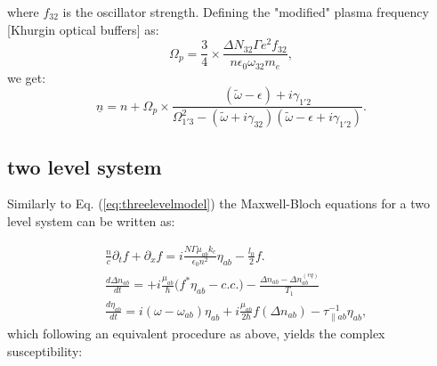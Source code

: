 \documentclass[10pt,letterpaper]{article}
\def\uline{\underline}
\begin{document}
	where $f_{32}$ is the oscillator strength. Defining the "modified" plasma frequency [Khurgin optical buffers] as: 
	$$
	\Omega_p = \frac{3}{4}\times \frac{\Delta N_{32}\Gamma e^2f_{32}}{n\epsilon_0\omega_{32}m_e}, 
	$$
	we get:
	$$
	\uline{n} = n+ \Omega_p \times \frac{(\tilde{\omega}-\epsilon)+i\gamma_{1'2}}{\Omega_{1'3}^2-(\tilde{\omega}+i\gamma_{32})(\tilde{\omega}-\epsilon+i\gamma_{1'2})}.
	$$ 
	
	\subsection{two level system}
	
	Similarly to Eq. (\ref{eq:threelevelmodel}) the Maxwell-Bloch equations for a two level system can be written as: 
	
	\begin{subequations}
		\label{eq:twolevelmodel}
		\begin{align}
		&\frac{n}{c}\partial_t f + \partial_{x}f = i\frac{N \Gamma \mu_{ab} k_c}{\epsilon_0 n^2} \eta_{ab} - \frac{l_0}{2} f \label{eq:rtwave} .\\
		&\frac{d \Delta n_{ab}}{d t} = + i\frac{\mu_{ab}}{\hbar} \big (f^*\eta_{ab}- c.c. \big )- \frac{\Delta n_{ab}-\Delta n_{ab}^{(eq)} }{T_{1}}  \\
		&\frac{d \eta_{ab}}{d t}   = i(\omega - \omega_{ab})\eta_{ab} +i \frac{\mu_{ab}}{2\hbar}f(\Delta n_{ab}) -  \tau_{\parallel ab}^{-1}\eta_{ab},
		\end{align}
	\end{subequations}
	which following an equivalent procedure as above, yields the complex susceptibility:
	
\end{document}
